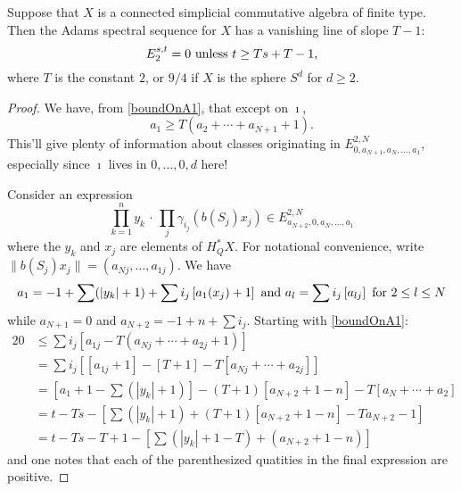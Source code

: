 \documentclass[10pt]{article}
\begin{document}
\begin{thm}
Suppose that $X$ is a connected simplicial commutative algebra of finite type. %
Then the Adams spectral sequence for $X$ has a vanishing line of slope $T-1$:
\[E_2^{s,t}=0\textup{\ unless $t\geq Ts+T-1$,}\]
where $T$ is the constant $2$, or $9/4$ if $X$ is the sphere $S^d$ for $d\geq2$.
\end{thm}
\begin{proof}
We have, from \ref{boundOnA1}, that except on $\imath$,
\[a_1\geq T(a_2+\cdots +a_{N+1}+1).\]
This'll give plenty of information about classes originating in $E^{2,N}_{0,a_{N+1},a_N,\ldots,a_1}$, especially since $\imath$ lives in $0,\ldots,0,d$ here!

Consider an expression 
\[\prod_{k=1}^ny_k\,\cdot\,\prod_j\gamma_{i_j}(b(S_j)x_j)\in E^{2,N}_{a_{N+2},0,a_N,\ldots,a_1}\]
where the $y_k$ and $x_j$ are elements of $H^*_QX$. For notational convenience, write $\|b(S_j)x_j\|=(a_{Nj},\ldots,a_{1j})$. We have
\[a_1=-1+\sum(|y_k|+1)+\sum i_j\left[a_1(x_j)+1\right]\textup{ and }a_l=\sum i_j\left[a_{lj}\right]\textup{ for $2\leq l\leq N$}\]
while $a_{N+1}=0$ and $a_{N+2}=-1+n+\sum i_j$. Starting with \ref{boundOnA1}:
\begin{alignat*}{2}
0
&\leq
\sum i_j\left[a_{1j}-T(a_{Nj}+\cdots +a_{2j}+1)\right]%
\\
&=
\sum i_j\left[[a_{1j}+1]-[T+1]-T[a_{Nj}+\cdots +a_{2j}]\right]%
\\
&=
[a_1+1-\sum(|y_k|+1)]-(T+1)[a_{N+2}+1-n]-T[a_N+\cdots +a_2]\\%
&=t-Ts-\left[\sum(|y_k|+1)+(T+1)[a_{N+2}+1-n]-Ta_{N+2}-1\right]\\%
&=t-Ts-T+1-\left[\sum(|y_k|+1-T)+(a_{N+2}+1-n)\right]
\end{alignat*}
and one notes that each of the parenthesized quatities in the final expression are positive.
\end{proof}

\begin{Endmatter}
\printbibliography
\end{Endmatter}
\end{document}
